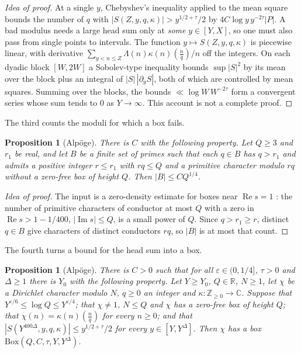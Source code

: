 \documentclass[11pt]{amsbook}
\theoremstyle{plain}
\newtheorem{proposition}[theorem]{Proposition}
\theoremstyle{definition}
\theoremstyle{remark}
\numberwithin{equation}{section}
\numberwithin{figure}{chapter}
\numberwithin{table}{chapter}
\newcommand{\Z}{\mathbb{Z}}
\newcommand{\R}{\mathbb{R}}
\renewcommand{\C}{\mathbb{C}}
\newcommand{\eps}{\varepsilon}
\begin{document}
\begin{proof}[Idea of proof]
At a single $y$, Chebyshev's inequality applied to the mean square
bounds the number of $q$ with $|S(Z,y,q,\kappa)|>y^{1/2+\tau}/2$ by
$4C\log y\,y^{-2\tau}|P|$. A bad modulus needs a large head sum only
at \emph{some} $y\in[Y,X]$, so one must also pass from single points
to intervals. The function $y\mapsto S(Z,y,q,\kappa)$ is piecewise
linear, with derivative $\sum_{y<n\le Z}\Lambda(n)\kappa(n)
(\frac nq)/n$ off the integers. On each dyadic block $[W,2W]$ a
Sobolev-type inequality bounds $\sup|S|^2$ by its mean over the block
plus an integral of $|S|\,|\partial_yS|$, both of which are
controlled by mean squares. Summing over the blocks, the bounds
$\ll\log W\,W^{-2\tau}$ form a convergent series whose sum tends to
$0$ as $Y\to\infty$. This account is not a complete proof.
\end{proof}

The third counts the moduli for which a box fails.

\begin{proposition}[Alp\"oge]\label{prop:zero-box}
There is $C$ with the following property. Let $Q\ge3$ and $r_1$ be
real, and let $B$ be a finite set of primes such that each $q\in B$ has
$q>r_1$ and admits a positive integer $r\le r_1$ with $rq\le Q$ and a
primitive character modulo $rq$ without a zero-free box of height $Q$.
Then $|B|\le CQ^{1/4}$.
\end{proposition}

\begin{proof}[Idea of proof]
The input is a zero-density estimate for boxes near
$\operatorname{Re}s=1$ \cite{MontgomeryVaughan2007}: the number of
primitive characters of conductor at most $Q$ with a zero in
$\operatorname{Re}s>1-1/400$, $|\operatorname{Im}s|\le Q$, is a small
power of $Q$. Since $q>r_1\ge r$, distinct $q\in B$ give characters
of distinct conductors $rq$, so $|B|$ is at most that count.
\end{proof}

The fourth turns a bound for the head sum into a box.

\begin{proposition}[Alp\"oge]\label{prop:box-from-headsum}
There is $C>0$ such that for all $\eps\in(0,1/4]$, $\tau>0$ and
$\Delta\ge1$ there is $Y_0$ with the following property. Let $Y\ge
Y_0$, $Q\in\R$, $N\ge1$, let $\chi$ be a Dirichlet character modulo
$N$, $q\ge0$ an integer and $\kappa\colon\Z_{\ge0}\to\C$. Suppose that
$Y^{\eps/6}\le\log Q\le Y^{\eps/4}$; that $\chi\ne1$, $N\le Q$ and
$\chi$ has a zero-free box of height $Q$; that $\chi(n)=\kappa(n)
(\frac nq)$ for every $n\ge0$; and that
$|S(Y^{400\Delta},y,q,\kappa)|\le y^{1/2+\tau}/2$ for every
$y\in[Y,Y^\Delta]$. Then $\chi$ has a box
$\mathrm{Box}(Q,C,\tau,Y,Y^\Delta)$.
\end{proposition}
\end{document}
